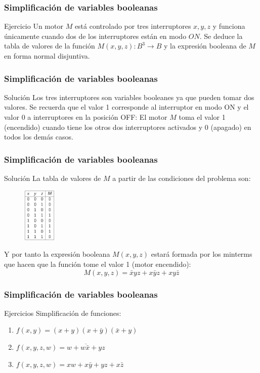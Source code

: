 \documentclass{beamer}
\begin{document}
\begin{frame}
\frametitle{Simplificaci\'on de variables booleanas}
\begin{block}{Ejercicio}
Un motor $M$ est\'a controlado por tres interruptores $x,y,z$ y funciona \'unicamente cuando dos de los interruptores est\'an en modo $ON$. Se deduce la tabla de valores de la funci\'on $M(x,y,z):B^3\longrightarrow B$ y la expresi\'on booleana de $M$ en forma normal disjuntiva. 
\end{block}
\end{frame}


\begin{frame}
\frametitle{Simplificaci\'on de variables booleanas}
\begin{block}{Soluci\'on}
Los tres interruptores son variables booleanes ya que pueden tomar dos valores. Se recuerda que el valor 1 corresponde al interruptor en modo ON y el valor 0 a interruptores en la posici\'on OFF: El motor $M$ toma el valor 1 (encendido) cuando tiene los otros dos interruptores activados y 0 (apagado) en todos los dem\'as casos. 
\end{block}
\end{frame}

\begin{frame}
\frametitle{Simplificaci\'on de variables booleanas}
\begin{block}{Soluci\'on}
La tabla de valores de $M$ a partir de las condiciones del problema son:
 \begin{figure}[h]
  \label{fig:volumen}
\centering
\includegraphics[height=2.6cm]{ex6}
\end{figure}
Y por tanto la expresi\'on booleana $M(x,y,z)$ estar\'a formada por los minterms que hacen que la funci\'on tome el valor 1 (motor encendido):
\[M(x,y,z) = \bar x y z + x\bar y z + x y \bar z\]
\end{block}
\end{frame}




\begin{frame}
\frametitle{Simplificaci\'on de variables booleanas}
\begin{block}{Ejercicios}
Simplificaci\'on de funciones:
\begin{enumerate}
\item $f(x,y) = (x+y)(x+\bar y) (\bar x + y)$
\item $f(x,y,z,w) = \overline{w+w\bar x + yz}$
\item $f(x,y,z,w) = xw+x\bar y + yz + x\bar z$
\end{enumerate}

\end{block}
\end{frame}
\end{document}
